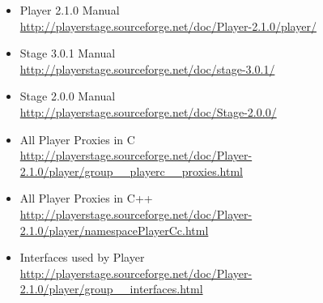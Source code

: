 \documentclass[a4paper]{report}
\begin{document}
\begin{itemize}

\item Player 2.1.0 Manual \\
\url{http://playerstage.sourceforge.net/doc/Player-2.1.0/player/}

\item Stage 3.0.1 Manual \\
\url{http://playerstage.sourceforge.net/doc/stage-3.0.1/}

\item Stage 2.0.0 Manual\\
\url{http://playerstage.sourceforge.net/doc/Stage-2.0.0/}

\item All Player Proxies in C\\
\url{http://playerstage.sourceforge.net/doc/Player-2.1.0/player/group__playerc__proxies.html}

\item All Player Proxies in C++\\
\url{http://playerstage.sourceforge.net/doc/Player-2.1.0/player/namespacePlayerCc.html}

\item Interfaces used by Player\\
\url{http://playerstage.sourceforge.net/doc/Player-2.1.0/player/group__interfaces.html}
\end{itemize}

\end{document}
